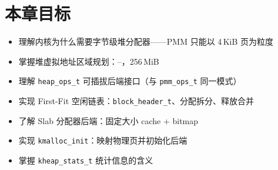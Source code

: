 \section{本章目标}

\begin{itemize}
  \item 理解内核为什么需要字节级堆分配器——PMM 只能以 4\,KiB 页为粒度
  \item 掌握堆虚拟地址区域规划：--，256\,MiB
  \item 理解 \texttt{heap\_ops\_t} 可插拔后端接口（与 \texttt{pmm\_ops\_t} 同一模式）
  \item 实现 First-Fit 空闲链表：\texttt{block\_header\_t}、分配拆分、释放合并
  \item 了解 Slab 分配器后端：固定大小 cache + bitmap
  \item 实现 \texttt{kmalloc\_init}：映射物理页并初始化后端
  \item 掌握 \texttt{kheap\_stats\_t} 统计信息的含义
\end{itemize}


